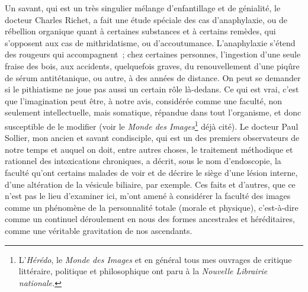 \documentclass[french,twoside]{book} %
\begin{document}
Un savant, qui est un très singulier mélange d’enfantillage et de génialité, le docteur Charles Richet, a fait une étude spéciale des cas d’anaphylaxie, ou de rébellion organique quant à certaines substances et à certains remèdes, qui s’opposent aux cas de mithridatisme, ou d’accoutumance. L’anaphylaxie s’étend des rougeurs qui accompagnent ; chez certaines personnes, l’ingestion d’une seule fraise des bois, aux accidents, quelquefois graves, du renouvellement d’une piqûre de sérum antitétanique, ou autre, à des années de distance. On peut se demander si le pithiatisme ne joue pas aussi un certain rôle là-dedans. Ce qui est vrai, c’est que l’imagination peut être, à notre avis, considérée comme une faculté, non seulement intellectuelle, mais somatique, répandue dans tout l’organisme, et donc susceptible de le modifier (voir le {\itshape Monde des Images}\footnote{ L’{\itshape Hérédo}, le {\itshape Monde des Images} et en général tous mes ouvrages de critique littéraire, politique et philosophique ont paru à la {\itshape Nouvelle Librairie nationale.}} déjà cité). Le docteur Paul Sollier, mon ancien et savant condisciple, qui est un des premiers observateurs de notre temps et auquel on doit, entre autres choses, le traitement méthodique et rationnel des intoxications chroniques, a décrit, sous le nom d’endoscopie, la faculté qu’ont certains malades de voir et de décrire le siège d’une lésion interne, d’une altération de la vésicule biliaire, par exemple. Ces faits et d’autres, que ce n’est pas le lieu d’examiner ici, m’ont amené à considérer la faculté des images comme un phénomène de la personnalité totale (morale et physique), c’est-à-dire comme un continuel déroulement en nous des formes ancestrales et héréditaires, comme une véritable gravitation de nos ascendants.\par
\end{document}
